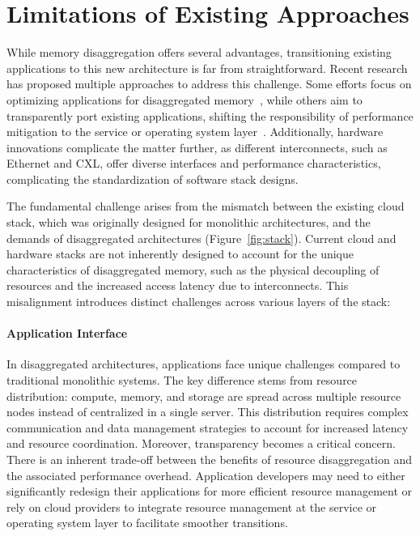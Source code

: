 \section{Limitations of Existing Approaches}

While memory disaggregation offers several advantages, transitioning existing applications to this new architecture is far from straightforward. Recent research has proposed multiple approaches to address this challenge. Some efforts focus on optimizing applications for disaggregated memory~\cite{farm, aifm, sherman, existing1}, while others aim to transparently port existing applications, shifting the responsibility of performance mitigation to the service or operating system layer~\cite{mind, legoos, fastswap, infiniswap, runtime1, runtime2}. Additionally, hardware innovations complicate the matter further, as different interconnects, such as Ethernet and CXL, offer diverse interfaces and performance characteristics, complicating the standardization of software stack designs.


The fundamental challenge arises from the mismatch between the existing cloud stack, which was originally designed for monolithic architectures, and the demands of disaggregated architectures (Figure~\ref{fig:stack}). Current cloud and hardware stacks are not inherently designed to account for the unique characteristics of disaggregated memory, such as the physical decoupling of resources and the increased access latency due to interconnects. This misalignment introduces distinct challenges across various layers of the stack:


\paragraph{Application Interface} In disaggregated architectures, applications face unique challenges compared to traditional monolithic systems. The key difference stems from resource distribution: compute, memory, and storage are spread across multiple resource nodes instead of centralized in a single server. This distribution requires complex communication and data management strategies to account for increased latency and resource coordination. Moreover, transparency becomes a critical concern. There is an inherent trade-off between the benefits of resource disaggregation and the associated performance overhead. Application developers may need to either significantly redesign their applications for more efficient resource management or rely on cloud providers to integrate resource management at the service or operating system layer to facilitate smoother transitions.

